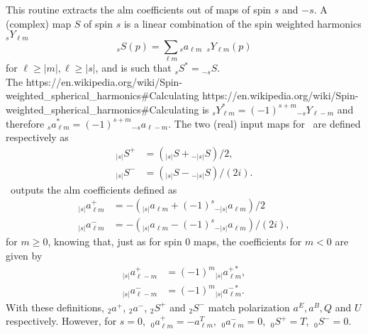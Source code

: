 
\sloppy


 \section[map2alm\_spin*]{ }
\label{sub:map2alm_spin}
\author{Eric Hivon}

\begin{facility}
{This routine extracts the alm coefficients out of maps of spin $s$ and $-s$.
%
A (complex) map $S$ of spin $s$ is a linear combination of the spin weighted harmonics ${_s}Y_{\ell m}$
\begin{equation}
	\label{eq:map2alm_spin_a}
	{_s}S(p) = \sum_{\ell m} {_s}a_{\ell m}\ \ {_s}Y_{\ell m}(p)
\end{equation}
for $\ell \ge |m|, \ell \ge |s|$,
and is such that ${_s}S^* = {_{-s}}S$.\\
The 
%
{https://en.wikipedia.org/wiki/Spin-weighted_spherical_harmonics\#Calculating}%
{https://en.wikipedia.org/wiki/Spin-weighted_spherical_harmonics\#Calculating}
is
${_s}Y_{\ell m}^* = (-1)^{s+m} {_{-s}}Y_{\ell -m}$
and therefore 
${_s}a_{\ell m}^* = (-1)^{s+m} {_{-s}}a_{\ell -m}$.
%
The two (real) input maps for \thedocid\ are defined respectively as
\begin{align}
	\label{eq:map2alm_spin_b}
	{_{|s|}}S^+ &= ({_{|s|}}S + {_{-|s|}}S)/2,\\
	{_{|s|}}S^- &= ({_{|s|}}S - {_{-|s|}}S)/(2i).
\end{align}
%
\thedocid\ outputs the alm coefficients defined as
\begin{align}
	\label{eq:map2alm_spin_c}
	{_{|s|}}a^{+}_{\ell m} &= - ( {_{|s|}}a_{\ell m} + (-1)^s {_{-|s|}}a_{\ell m} )/2\\
	{_{|s|}}a^{-}_{\ell m} &= - ( {_{|s|}}a_{\ell m} - (-1)^s {_{-|s|}}a_{\ell m} )/(2i),
\end{align}
for $m\ge 0$, knowing that, just as for spin 0 maps, the
coefficients for $m<0$ are given by 
\begin{align}
	\label{eq:map2alm_spin_c}
	{_{|s|}}a^{+}_{\ell-m} &= (-1)^m {_{|s|}}a^{+*}_{\ell m},\\
	{_{|s|}}a^{-}_{\ell-m} &= (-1)^m {_{|s|}}a^{-*}_{\ell m}.
\end{align}
%
With these definitions, ${_2}a^{+}$, ${_2}a^{-}$, ${_2}S^+$ and ${_2}S^-$
match \healpix  polarization $a^E, a^B, Q$ and $U$ respectively. However, for
$s=0$, $\ _{0}a^+_{\ell m} = -a^T_{\ell m}$, $\ _{0}a^-_{\ell m} = 0$, $\ {_0}S^+ = T$, $\
{_0}S^- = 0.$
}
{\modAlmTools}
\end{facility}


